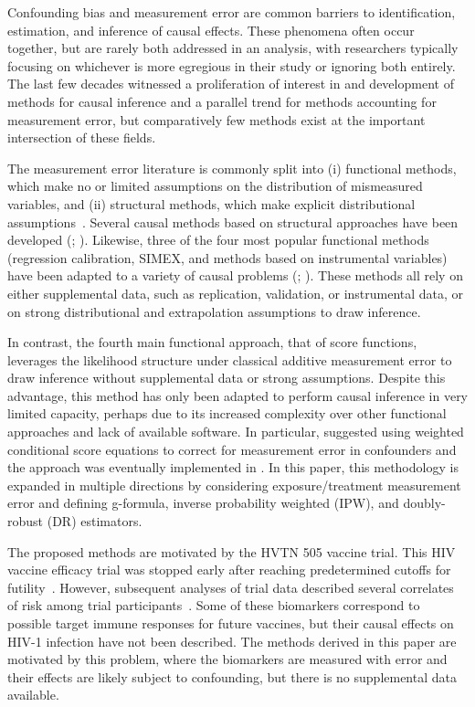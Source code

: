\documentclass[useAMS,usenatbib,referee]{biom}
\begin{document}
Confounding bias and measurement error are common barriers to identification, estimation, and inference of causal effects. These phenomena often occur together, but are rarely both addressed in an analysis, with researchers typically focusing on whichever is more egregious in their study or ignoring both entirely. The last few decades witnessed a proliferation of interest in and development of methods for causal inference and a parallel trend for methods accounting for measurement error, but comparatively few methods exist at the important intersection of these fields.

The measurement error literature is commonly split into (i) functional methods, which make no or limited assumptions on the distribution of mismeasured variables, and (ii) structural methods, which make explicit distributional assumptions~\citep{carroll2006}. Several causal methods based on structural approaches have been developed (\citealp{kuroki2014,edwards2015multiple,braun2017}; \citealp*{hong2017}). Likewise, three of the four most popular functional methods (regression calibration, SIMEX, and methods based on instrumental variables) have been adapted to a variety of causal problems (\citealp*{vansteelandt2009}; \citealp{cole2010,kendall2015,lockwood2015,kyle2016,wu2019}). These methods all rely on either supplemental data, such as replication, validation, or instrumental data, or on strong distributional and extrapolation assumptions to draw inference.

In contrast, the fourth main functional approach, that of score functions, leverages the likelihood structure under classical additive measurement error to draw inference without supplemental data or strong assumptions. Despite this advantage, this method has only been adapted to perform causal inference in very limited capacity, perhaps due to its increased complexity over other functional approaches and lack of available software. In particular, \citet*{mccaffrey2013} suggested using weighted conditional score equations to correct for measurement error in confounders and the approach was eventually implemented in \citet{shu2019}. In this paper, this methodology is expanded in multiple directions by considering exposure/treatment measurement error and defining g-formula, inverse probability weighted (IPW), and doubly-robust (DR) estimators.

The proposed methods are motivated by the HVTN 505 vaccine trial. This HIV vaccine efficacy trial was stopped early after reaching predetermined cutoffs for futility~\citep{hammer2013}. However, subsequent analyses of trial data described several correlates of risk among trial participants~\citep{decamp2017,janes2017,fong2018,neidich2019}. Some of these biomarkers correspond to possible target immune responses for future vaccines, but their causal effects on HIV-1 infection have not been described. The methods derived in this paper are motivated by this problem, where the biomarkers are measured with error and their effects are likely subject to confounding, but there is no supplemental data available.
\end{document}
